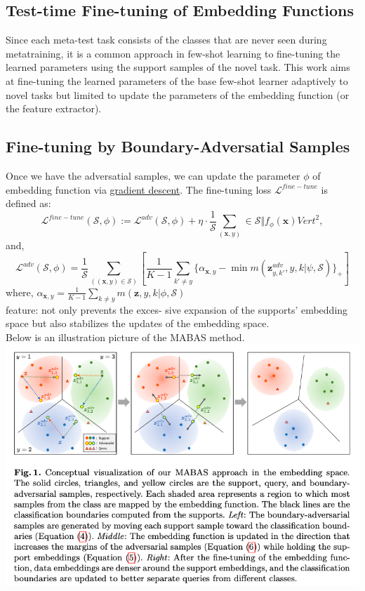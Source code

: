 \documentclass{article}
\begin{document}
\subsection{Test-time Fine-tuning of Embedding Functions}
Since each meta-test task consists of the classes that are never seen during metatraining, 
it is a common approach in few-shot learning to fine-tuning the learned parameters using the
support samples of the novel task. This work aims at fine-tuning the learned parameters of the
base few-shot learner adaptively to novel tasks but limited to update the parameters of the
embedding function (or the feature extractor). 
\subsection{Fine-tuning by Boundary-Adversatial Samples}
Once we have the adversatial samples, we can update the parameter $\phi$ of embedding function via \underline{gradient descent}. The fine-tuning loss $\mathcal{L}^{fine-tune}$ is defined as: \\
$$
\mathcal{L}^{fine-tune}(\mathcal{S}, \phi) := \mathcal{L}^{adv}(\mathcal{S}, \phi) + \eta \cdot \frac{1}{\mathcal{S}}\sum_{(\textbf{x},y)}\in\mathcal{S}{\Vert}f_{\phi}(\textbf{x}){Vert}^2,
$$
and, 
$$
\mathcal{L}^{adv}(\mathcal{S}, \phi) = 
\frac{1}{\mathcal{S}} 
\sum_((\textbf{x}, y) \in \mathcal{S})[
    \frac{1}{K - 1} \sum_{k\prime \neq y} 
        \{\alpha_{\textbf{x},y} - 
        \min{
            m(\textbf{z}_{y, k\prime}^{adv}, y, k | \psi, \mathcal{S})
            } 
        \}_+
    ]
$$
where,
$
\alpha_{\textbf{x}, y} =
\frac{1}{K - 1} 
\sum_{k \neq y} 
m 
(\textbf{z}, y, k 
|
\phi,
\mathcal{S}
)
$
\\
feature: not only prevents the exces- sive expansion 
of the supports’ embedding space but also stabilizes 
the updates of the embedding space.\\
Below is an illustration picture of the MABAS method.\\
\includegraphics[scale=0.6]{src/img/MABAS Illustration.jpg}\\
\end{document}
